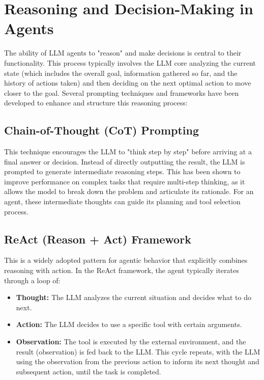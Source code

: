 \section{Reasoning and Decision-Making in Agents}

The ability of LLM agents to "reason" and make decisions is central to their functionality. This process typically involves the LLM core analyzing the
 current state (which includes the overall goal, information gathered so far, and the history of actions taken) and then deciding on the next optimal 
 action to move closer to the goal. Several prompting techniques and frameworks have been developed to enhance and structure this reasoning process:

\subsection*{Chain-of-Thought (CoT) Prompting}
This technique encourages the LLM to "think step by step" before arriving at a final answer or decision. Instead of directly outputting the result, 
the LLM is prompted to generate intermediate reasoning steps. This has been shown to improve performance on complex tasks that require multi-step thinking, 
as it allows the model to break down the problem and articulate its rationale. For an agent, these intermediate thoughts can guide 
its planning and tool selection process.

\subsection*{ReAct (Reason + Act) Framework}
This is a widely adopted pattern for agentic behavior that explicitly combines reasoning with action. In the ReAct framework, the agent typically 
iterates through a loop of:

\begin{itemize}
    \item \textbf{Thought:} The LLM analyzes the current situation and decides what to do next.
    \item \textbf{Action:} The LLM decides to use a specific tool with certain arguments.
    \item \textbf{Observation:} The tool is executed by the external environment, and the result (observation) is fed back to the LLM. 
    This cycle repeats, with the LLM using the observation from the previous action to inform its next thought and subsequent action, 
    until the task is completed.
\end{itemize}

